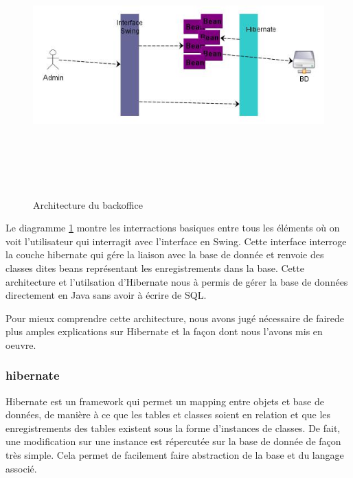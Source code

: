 \documentclass[11pt,a4paper]{article}
\begin{document}
\begin{figure}[h]
  		\centering
  		\includegraphics[height=10cm,width=13cm]{backoffice.jpg}
  		\caption{Architecture du backoffice}
  		\label{backoffice}
\end{figure}

Le diagramme \ref{backoffice} montre les interractions basiques entre tous les
éléments où on voit l'utilisateur qui interragit avec l'interface en Swing.
Cette interface interroge la couche hibernate qui gére la liaison
avec la base de donnée et renvoie des classes dites beans représentant les
enregistrements dans la base. Cette architecture et l'utilsation d'Hibernate
nous à permis de gérer la base de données directement en Java sans avoir à
écrire de SQL.


Pour mieux comprendre cette architecture, nous avons jugé nécessaire de fairede
plus amples explications sur Hibernate et la façon dont nous l'avons mis en
oeuvre.


\subsubsection{hibernate}

Hibernate est un framework qui permet un mapping entre objets et base de
données, de manière à ce que les tables et classes soient en relation et que les
enregistrements des tables existent sous la forme d'instances de classes. De
fait, une modification sur une instance est répercutée sur la base de donnée de
façon très simple. Cela permet de facilement faire abstraction de la base et du
langage associé.
\end{document}
